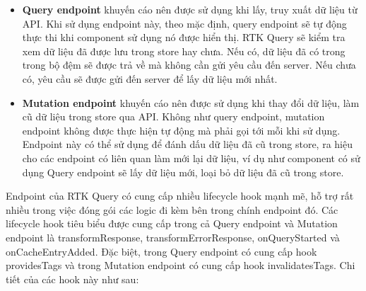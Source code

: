 \begin{itemize}
  \item \textbf{Query endpoint} khuyến cáo nên được sử dụng khi lấy, truy xuất dữ liệu từ API.
        Khi sử dụng endpoint này, theo mặc định, query endpoint sẽ tự động thực thi khi component sử dụng nó được hiển thị.
        RTK Query sẽ kiểm tra xem dữ liệu đã được lưu trong store hay chưa.
        Nếu có, dữ liệu đã có trong trong bộ đệm sẽ được trả về mà không cần gửi yêu cầu đến server.
        Nếu chưa có, yêu cầu sẽ được gửi đến server để lấy dữ liệu mới nhất.
  \item \textbf{Mutation endpoint} khuyến cáo nên được sử dụng khi thay đổi dữ liệu, làm cũ dữ liệu trong store qua API.
        Không như query endpoint, mutation endpoint không được thực hiện tự động mà phải gọi tới mỗi khi sử dụng.
        Endpoint này có thể sử dụng để đánh dấu dữ liệu đã cũ trong store, ra hiệu cho các endpoint có liên quan làm mới lại dữ liệu, ví dụ như component có sử dụng Query endpoint sẽ lấy dữ liệu mới, loại bỏ dữ liệu đã cũ trong store.
\end{itemize}

Endpoint của RTK Query có cung cấp nhiều lifecycle hook mạnh mẽ, hỗ trợ rất nhiều trong việc đóng gói các logic đi kèm bên trong chính endpoint đó.
Các lifecycle hook tiêu biểu được cung cấp trong cả Query endpoint và Mutation endpoint là transformResponse,  transformErrorResponse, onQueryStarted và onCacheEntryAdded.
Đặc biệt, trong Query endpoint có cung cấp hook providesTags và trong Mutation endpoint có cung cấp hook invalidatesTags.
Chi tiết của các hook này như sau:

